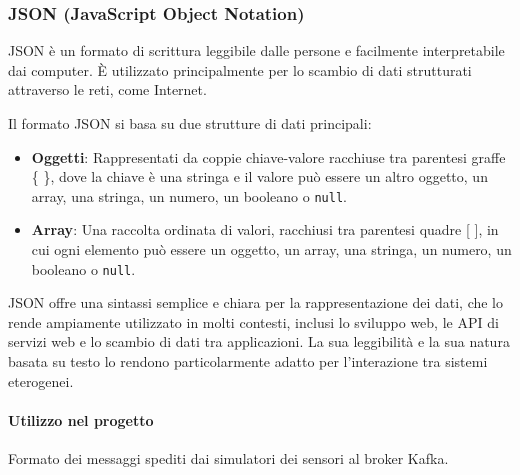 \subsubsection{JSON (JavaScript Object Notation)}
JSON è un formato di scrittura leggibile dalle persone e facilmente interpretabile dai computer. È utilizzato principalmente per lo scambio di dati strutturati attraverso le reti, come Internet.

Il formato JSON si basa su due strutture di dati principali:

\begin{itemize}
  \item \textbf{Oggetti}: Rappresentati da coppie chiave-valore racchiuse tra parentesi graffe \{ \}, dove la chiave è una stringa e il valore può essere un altro oggetto, un array, una stringa, un numero, un booleano o \texttt{null}.
  \item \textbf{Array}: Una raccolta ordinata di valori, racchiusi tra parentesi quadre [ ], in cui ogni elemento può essere un oggetto, un array, una stringa, un numero, un booleano o \texttt{null}.
\end{itemize}

JSON offre una sintassi semplice e chiara per la rappresentazione dei dati, che lo rende ampiamente utilizzato in molti contesti, inclusi lo sviluppo web, le API di servizi web e lo scambio di dati tra applicazioni. La sua leggibilità e la sua natura basata su testo lo rendono particolarmente adatto per l'interazione tra sistemi eterogenei.
\paragraph{Utilizzo nel progetto}
Formato dei messaggi spediti dai
simulatori dei sensori
al broker Kafka.
